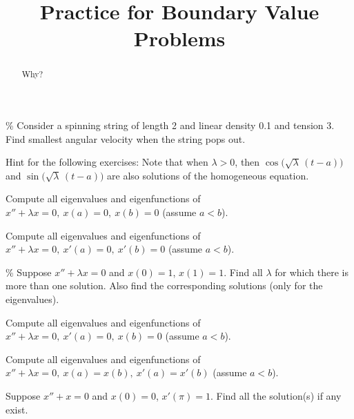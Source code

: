 \documentclass{ximera}
\title{Practice for Boundary Value Problems}
\begin{document}
\begin{abstract}
Why?
\end{abstract}
\maketitle


\begin{exercise}\%
    Consider a spinning string of length 2 and linear density 0.1 and tension 3. Find smallest angular velocity when the string pops out.
\end{exercise}


Hint for the following exercises:  Note that when $\lambda > 0$, then $\cos \bigl( \sqrt{\lambda}\, (t - a) \bigr)$ and $\sin  \bigl( \sqrt{\lambda}\, (t - a) \bigr)$ are also solutions of the homogeneous equation.

\begin{exercise}
    Compute all eigenvalues and eigenfunctions of $x'' + \lambda x = 0, ~ x(a) = 0, ~ x(b) = 0$ (assume $a < b$).
\end{exercise}

\begin{exercise}
    Compute all eigenvalues and eigenfunctions of $x'' + \lambda x = 0, ~ x'(a) = 0, ~ x'(b) = 0$ (assume $a < b$).
\end{exercise}

\begin{exercise}\%
    Suppose $x'' + \lambda x = 0$ and $x(0)=1$, $x(1) = 1$. Find all $\lambda$ for which there is more than one solution.  Also find the corresponding solutions (only for the eigenvalues).
\end{exercise}


\begin{exercise}
    Compute all eigenvalues and eigenfunctions of $x'' + \lambda x = 0, ~ x'(a) = 0, ~ x(b) = 0$ (assume $a < b$).
\end{exercise}

\begin{exercise}
    Compute all eigenvalues and eigenfunctions of $x'' + \lambda x = 0, ~ x(a) = x(b), ~ x'(a) = x'(b)$ (assume $a < b$).
\end{exercise}

\begin{exercise}%
    Suppose $x'' + x = 0$ and $x(0)=0$, $x'(\pi) = 1$. Find all the solution(s) if any exist.
\end{exercise}
\end{document}
